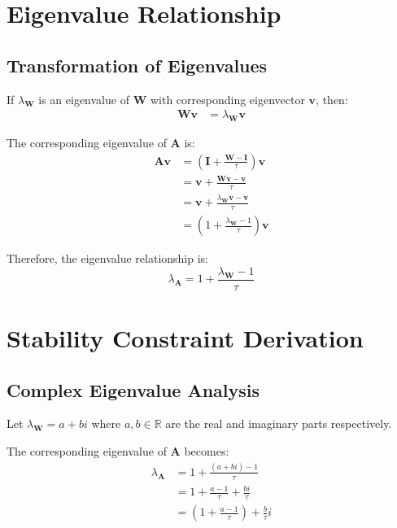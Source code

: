 \documentclass[11pt]{article}
\begin{document}
\section{Eigenvalue Relationship}

\subsection{Transformation of Eigenvalues}

If $\lambda_{\mathbf{W}}$ is an eigenvalue of $\mathbf{W}$ with corresponding eigenvector $\mathbf{v}$, then:
\begin{align}
\mathbf{W}\mathbf{v} &= \lambda_{\mathbf{W}}\mathbf{v}
\end{align}

The corresponding eigenvalue of $\mathbf{A}$ is:
\begin{align}
\mathbf{A}\mathbf{v} &= \left(\mathbf{I} + \frac{\mathbf{W} - \mathbf{I}}{\tau}\right)\mathbf{v}\\
&= \mathbf{v} + \frac{\mathbf{W}\mathbf{v} - \mathbf{v}}{\tau}\\
&= \mathbf{v} + \frac{\lambda_{\mathbf{W}}\mathbf{v} - \mathbf{v}}{\tau}\\
&= \left(1 + \frac{\lambda_{\mathbf{W}} - 1}{\tau}\right)\mathbf{v}
\end{align}

Therefore, the eigenvalue relationship is:
\begin{equation}
\lambda_{\mathbf{A}} = 1 + \frac{\lambda_{\mathbf{W}} - 1}{\tau}
\end{equation}

\section{Stability Constraint Derivation}

\subsection{Complex Eigenvalue Analysis}

Let $\lambda_{\mathbf{W}} = a + bi$ where $a, b \in \mathbb{R}$ are the real and imaginary parts respectively.

The corresponding eigenvalue of $\mathbf{A}$ becomes:
\begin{align}
\lambda_{\mathbf{A}} &= 1 + \frac{(a + bi) - 1}{\tau}\\
&= 1 + \frac{a - 1}{\tau} + \frac{bi}{\tau}\\
&= \left(1 + \frac{a - 1}{\tau}\right) + \frac{b}{\tau}i
\end{align}
\end{document}
